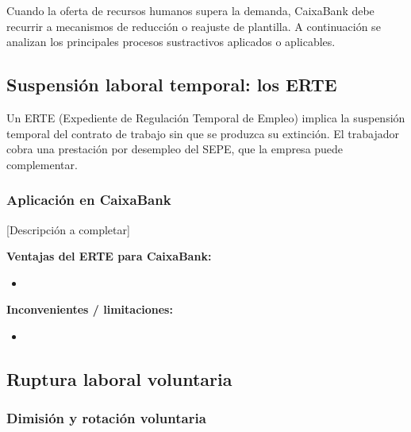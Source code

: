 Cuando la oferta de recursos humanos supera la demanda, CaixaBank debe
recurrir a mecanismos de reducción o reajuste de plantilla. A continuación
se analizan los principales procesos sustractivos aplicados o aplicables.

\subsection{Suspensión laboral temporal: los ERTE}


Un ERTE (Expediente de Regulación Temporal de Empleo) implica la suspensión
temporal del contrato de trabajo sin que se produzca su extinción. El
trabajador cobra una prestación por desempleo del SEPE, que la empresa puede
complementar.

\subsubsection{Aplicación en CaixaBank}

[Descripción a completar]

\textbf{Ventajas del ERTE para CaixaBank:}
\begin{itemize}
  \item [...]
\end{itemize}

\textbf{Inconvenientes / limitaciones:}
\begin{itemize}
  \item [...]
\end{itemize}

\subsection{Ruptura laboral voluntaria}

\subsubsection{Dimisión y rotación voluntaria}


